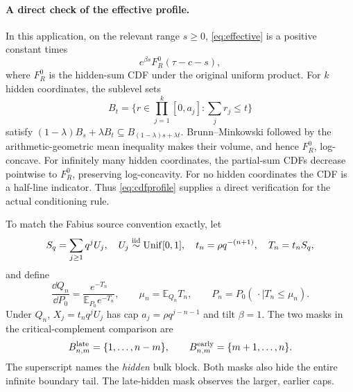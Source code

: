 \documentclass[11pt,a4paper]{article}
\theoremstyle{remark}\newtheorem*{ednote}{Editorial note (ProveIt, 2026-10-01)}
\newcommand{\E}{\mathbb E}\newcommand{\R}{\mathbb R}\newcommand{\N}{\mathbb N}
\begin{document}
\paragraph{A direct check of the effective profile.}
In this application, on the relevant range $s\ge0$, \eqref{eq:effective} is a positive constant times
\begin{equation}\label{eq:cdfprofile}
 e^{\beta s}F_R^0(\tau-c-s),
\end{equation}
where $F_R^0$ is the hidden-sum CDF under the original uniform product. For $k$ hidden coordinates, the sublevel sets
\[
 B_t=\{r\in\textstyle\prod_{j=1}^k[0,a_j]:\sum_jr_j\le t\}
\]
satisfy $(1-\lambda)B_s+\lambda B_t\subseteq B_{(1-\lambda)s+\lambda t}$. Brunn--Minkowski followed by the arithmetic-geometric mean inequality makes their volume, and hence $F_R^0$, log-concave. For infinitely many hidden coordinates, the partial-sum CDFs decrease pointwise to $F_R^0$, preserving log-concavity. For no hidden coordinates the CDF is a half-line indicator. Thus \eqref{eq:cdfprofile} supplies a direct verification for the actual conditioning rule.

To match the Fabius source convention exactly, let
\[
 S_q=\sum_{j\ge1}q^jU_j,\quad U_j\overset{\rm iid}{\sim}\operatorname{Unif}[0,1],
 \quad t_n=\rho q^{-(n+1)},\quad T_n=t_nS_q,
\]
and define
\[
 \frac{\dd Q_n}{\dd P_0}=\frac{e^{-T_n}}{\E_{P_0}e^{-T_n}},
 \qquad \mu_n=\E_{Q_n}T_n,\qquad
 P_n=P_0(\,\cdot\mid T_n\le\mu_n).
\]
Under $Q_n$, $X_j=t_nq^jU_j$ has cap $a_j=\rho q^{j-n-1}$ and tilt $\beta=1$. The two masks in the critical-complement comparison are
\begin{equation}\label{eq:masks}
 B^{\rm late}_{n,m}=\{1,\ldots,n-m\},
 \qquad B^{\rm early}_{n,m}=\{m+1,\ldots,n\}.
\end{equation}
The superscript names the \emph{hidden} bulk block. Both masks also hide the entire infinite boundary tail. The late-hidden mask observes the larger, earlier caps.
\end{document}
